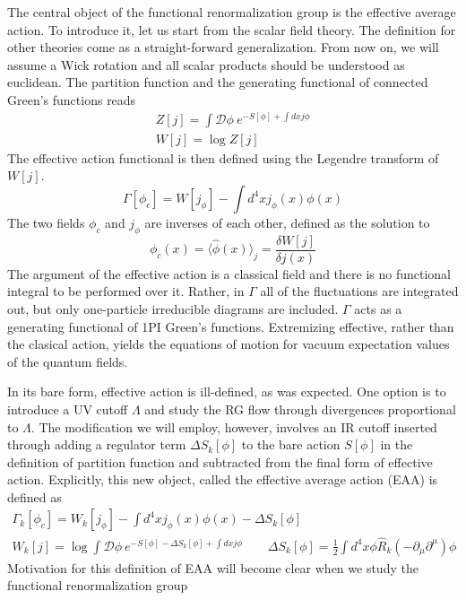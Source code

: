 \documentclass[11pt, a4paper]{article}
\begin{document}
The central object of the functional renormalization group is the effective average action.
To introduce it, let us start from the scalar field theory. The definition for other theories come as a straight-forward generalization.
From now on, we will assume a Wick rotation
and all scalar products should be understood as euclidean.
The partition function and the generating functional of connected Green's functions reads
\begin{gather}
    Z[j] = \int \mathcal{D}\phi \ e^{-S[\phi] + \int dx j \phi} \\
    W[j] = \log{Z[j]}
\end{gather}
The effective action functional is then defined using the Legendre transform of $W[j]$.
\begin{equation}
    \Gamma[\phi_c] = W[j_\phi] - \int d^4 x j_\phi(x) \phi(x)
\end{equation}
The two fields $\phi_c$ and $j_\phi$ are inverses of each other, defined as the solution to
\begin{equation}
    \phi_c(x) = \langle \hat\phi (x) \rangle_j = \frac{\delta W[j]}{\delta j(x)}
\end{equation}
The argument of the effective action is a classical field and there is no functional integral to be performed over it.
Rather, in $\Gamma$ all of the fluctuations are integrated out, but only one-particle irreducible diagrams
are included. $\Gamma$ acts as a generating functional of 1PI Green's functions. Extremizing effective, rather than
the clasical action, yields the equations of motion for vacuum expectation values of the quantum fields.

In its bare form, effective action is ill-defined, as was expected. One option is to introduce a UV cutoff $\Lambda$
and study the RG flow through divergences proportional to $\Lambda$. The modification we will employ, however, involves
an IR cutoff inserted through adding a regulator term $\Delta S_k[\phi]$ to the bare action $S[\phi]$ in the definition of partition function
and subtracted from the final form of effective action. Explicitly, this new object, called the effective average action (EAA) is defined as
\begin{gather}
    \Gamma_k[\phi_c] = W_k[j_\phi] - \int d^4 x j_\phi(x) \phi(x) - \Delta S_k[\phi]\\
    W_k[j] = \log{\int \mathcal{D}\phi \ e^{-S[\phi] - \Delta S_k[\phi] + \int dx j \phi}} \qquad \Delta S_k[\phi] = \frac{1}{2}\int d^4 x \phi \hat{R}_k (-\partial_{\mu}\partial^{\mu}) \phi
\end{gather}
Motivation for this definition of EAA will become clear when we study the functional renormalization group
\end{document}
